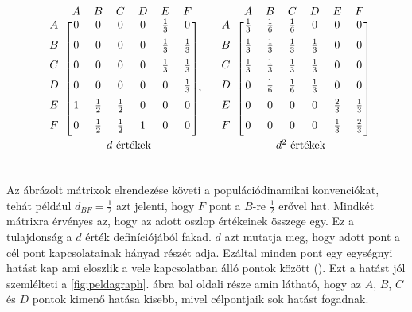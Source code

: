 \documentclass[a4paper,12pt]{article}
\begin{document}
	\[
	\begin{blockarray}{ccccccc}
	&A & B & C & D & E & F \\
	\begin{block}{c [cccccc]}
	A &0 & 0 & 0 & 0 & \frac{1}{3} & 0 \\[6pt] 
	B & 0 & 0 & 0 & 0 & \frac{1}{3} & \frac{1}{3}\\[6pt] 
	C & 0 & 0 & 0 & 0 & \frac{1}{3} & \frac{1}{3}\\[6pt] 
	D & 0 & 0 & 0 & 0 & 0 & \frac{1}{3}\\[6pt] 
	E & 1 & \frac{1}{2} & \frac{1}{2} & 0 & 0 & 0\\ [6pt] 
	F & 0 & \frac{1}{2} & \frac{1}{2} & 1 & 0 & 0\\ [6pt]
	\end{block}
	\multicolumn{7}{c}{\indent $d$ értékek} \\ [6pt]
	\end{blockarray},\quad
	\begin{blockarray}{ccccccc}
	&A & B & C & D & E & F \\ 
	\begin{block}{c [cccccc]}
	A & \frac{1}{3} & \frac{1}{6} & \frac{1}{6} & 0 & 0 & 0 \\[6pt] 
	B & \frac{1}{3} & \frac{1}{3} & \frac{1}{3} & \frac{1}{3} & 0 & 0\\ [6pt] 
	C & \frac{1}{3} & \frac{1}{3} & \frac{1}{3} & \frac{1}{3} & 0 & 0\\[6pt] 
	D & 0 & \frac{1}{6} & \frac{1}{6} & \frac{1}{3} & 0 & 0\\[6pt] 
	E & 0 & 0 & 0 & 0 & \frac{2}{3} & \frac{1}{3}\\ [6pt] 
	F & 0 & 0 & 0 & 0 & \frac{1}{3} & \frac{2}{3}\\ [6pt]
	\end{block}
	\multicolumn{7}{c}{\indent $d^2$ értékek} \\[6pt]
	\end{blockarray}
	\]
	
	Az ábrázolt mátrixok elrendezése követi a populációdinamikai konvenciókat, tehát például $d_{BF}=\frac{1}{2}$ azt jelenti, hogy $F$ pont a $B$-re $\frac{1}{2}$ erővel hat. Mindkét mátrixra érvényes az, hogy az adott oszlop értékeinek összege egy. Ez a tulajdonság a $d$ érték definíciójából fakad. $d$ azt mutatja meg, hogy adott pont a cél pont kapcsolatainak hányad részét adja. Ezáltal minden pont egy egységnyi hatást kap ami eloszlik a vele kapcsolatban álló pontok között (\cite{ti}). Ezt a hatást jól szemlélteti a \ref{fig:peldagraph}. ábra bal oldali része amin látható, hogy az $A$, $B$, $C$ és $D$ pontok kimenő hatása kisebb, mivel célpontjaik sok hatást fogadnak.
	
\end{document}
